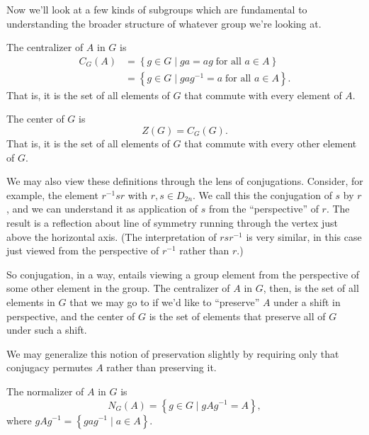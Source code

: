 \documentclass[../m171main.tex]{subfiles}
\begin{document}
Now we'll look at a few kinds of subgroups which are fundamental to understanding the broader structure of whatever group we're looking at.

\pagebreak

\begin{definition}[Centralizer]
    The centralizer of $A$ in $G$ is
    \begin{align*}
        C_G(A) &= \left\{ g \in G \mid ga = ag \;\text{for all $a \in A$} \right\} \\
        &= \left\{ g \in G \mid gag^{-1} = a \;\text{for all $a \in A$} \right\}.
    \end{align*}
    That is, it is the set of all elements of $G$ that commute with every element of $A$.
\end{definition}

\begin{definition}[Center]
    The center of $G$ is
    \[ Z(G) = C_G(G). \]
    That is, it is the set of all elements of $G$ that commute with every other element of $G$.
\end{definition}

We may also view these definitions through the lens of conjugations.
Consider, for example, the element $r^{-1} s r$ with $r,s \in D_{2n}$.
We call this the conjugation of $s$ by $r$, and we can understand it as application of $s$ from the ``perspective'' of $r$.
The result is a reflection about line of symmetry running through the vertex just above the horizontal axis.
(The interpretation of $rs r^{-1}$ is very similar, in this case just viewed from the perspective of $r^{-1}$ rather than $r$.)

So conjugation, in a way, entails viewing a group element from the perspective of some other element in the group.
The centralizer of $A$ in $G$, then, is the set of all elements in $G$ that we may go to if we'd like to ``preserve'' $A$ under a shift in perspective, and the center of $G$ is the set of elements that preserve all of $G$ under such a shift.

We may generalize this notion of preservation slightly by requiring only that conjugacy permutes $A$ rather than preserving it.

\begin{definition}[Normalizer]
    The normalizer of $A$ in $G$ is
    \[ N_G(A) = \left\{ g \in G \mid gAg^{-1} = A \right\}, \]
    where $gAg^{-1} = \left\{ gag^{-1} \mid a \in A \right\}$.
\end{definition}
\end{document}
